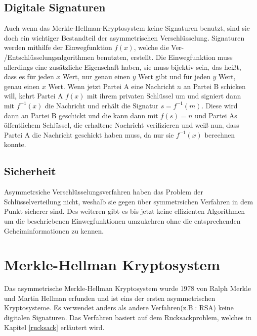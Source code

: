 \documentclass[a4paper,12pt,titlepage]{article}
\begin{document}
\subsection{Digitale Signaturen}
Auch wenn das Merkle-Hellman-Kryptosystem keine Signaturen benutzt, sind sie doch ein wichtiger Bestandteil der asymmetrischen Verschlüsselung.
Signaturen werden mithilfe der Einwegfunktion $f(x)$, welche die Ver- /Entschlüsselungsalgorithmen benutzten, erstellt. Die Einwegfunktion muss allerdings eine zusätzliche Eigenschaft haben, sie muss bijektiv sein, das heißt, dass es für jeden $x$ Wert, nur genau einen $y$ Wert gibt und für jeden $y$ Wert, genau einen $x$ Wert.
Wenn jetzt Partei A eine Nachricht $n$ an Partei B schicken will, kehrt Partei A $f(x)$ mit ihrem privaten Schlüssel um und signiert dann mit $f^{-1}(x)$ die Nachricht und erhält die Signatur $s = f^{-1}(m)$. Diese wird dann an Partei B geschickt und die kann dann mit $f(s) = n$ und Partei As öffentlichem Schlüssel, die erhaltene Nachricht verifizieren und weiß nun, dass Partei A die Nachricht geschickt haben muss, da nur sie $f^{-1}(x)$ berechnen konnte.
\subsection{Sicherheit} %
Asymmetrsiche Verschlüsselungsverfahren haben das Problem der Schlüsselverteilung nicht, weshalb sie gegen über symmetrsichen Verfahren in dem Punkt sicherer sind. Des weiteren gibt es bis jetzt keine effizienten Algorithmen um die beschriebenen Einwegfunktionen umzukehren ohne die entsprechenden Geheiminformationen zu kennen.



\section{Merkle-Hellman Kryptosystem}\label{mhk}
Das asymmetrische Merkle-Hellman Kryptosystem wurde 1978 von Ralph Merkle und Martin Hellman erfunden und ist eins der ersten asymmetrischen Kryptosysteme. Es verwendet anders als andere Verfahren(z.B.: RSA) keine digitalen Signaturen. Das Verfahren basiert auf dem Rucksackproblem, welches in Kapitel \ref{rucksack} erläutert wird.

\end{document}
